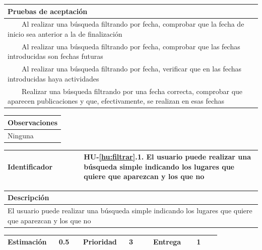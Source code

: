 \documentclass[11pt]{article}
\newcommand{\tabitem}{~~\llap{\textbullet}~~}
\begin{document}
  \begin{longtable}{p{1.028\linewidth}}
    \textbf{Pruebas de aceptación}\\
    \midrule
    \tabitem Al realizar una búsqueda filtrando por fecha, comprobar que la fecha de inicio sea anterior a la de finalización\\
    \tabitem Al realizar una búsqueda filtrando por fecha, comprobar que las fechas introducidas son fechas futuras\\
    \tabitem Al realizar una búsqueda filtrando por fecha, verificar que en las fechas introducidas haya actividades\\
    \tabitem Realizar una búsqueda filtrando por una fecha correcta, comprobar que aparecen publicaciones y que, efectivamente, se realizan en esas fechas\\
\end{longtable}
\begin{longtable}{p{1.028\linewidth}}
  \textbf{Observaciones}\\
  \midrule
  Ninguna\\
  \bottomrule
  \bottomrule
\end{longtable}


\centering
\begin{longtable}{p{0.3\linewidth}|p{0.7\linewidth}}
	\toprule
	\toprule
	\textbf{Identificador} & \textbf{HU-\ref{hu:filtrar}.1}. El usuario puede realizar una búsqueda simple indicando los lugares que quiere que aparezcan y los que no\\
	
	\bottomrule
\end{longtable}

\begin{longtable}{p{1.028\linewidth}}
	\textbf{Descripción}\\
	\midrule
	El usuario puede realizar una búsqueda simple indicando los lugares que quiere que aparezcan y los que no
\end{longtable}
\begin{longtable}{p{0.18\linewidth}|p{0.1\linewidth}|p{0.18\linewidth}|p{0.1\linewidth}|p{0.18\linewidth}|p{0.1\linewidth}}
	\toprule
	\textbf{Estimación} & 0.5 & \textbf{Prioridad} & 3 & \textbf{Entrega} & 1 \\
	\bottomrule
\end{longtable}
\end{document}
